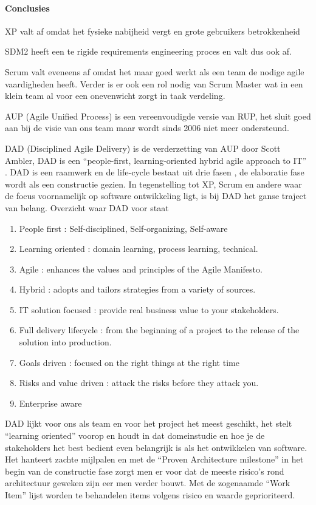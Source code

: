 \paragraph{Conclusies}
\begin{description}
\item XP valt af omdat het fysieke nabijheid vergt en grote gebruikers betrokkenheid
\item SDM2 heeft een te rigide requirements engineering proces en valt dus ook af.
\item Scrum valt eveneens af omdat het maar goed werkt als een team de nodige agile vaardigheden heeft. Verder is er ook een rol nodig van Scrum Master wat in een klein team al voor een onevenwicht zorgt in taak verdeling.
\item AUP (Agile Unified Process) is een vereenvoudigde versie van RUP, het sluit goed aan bij de visie van ons team maar wordt sinds 2006 niet meer ondersteund.
\item DAD (Disciplined Agile Delivery) is de verderzetting van AUP door Scott Ambler, DAD is een ``people-first, learning-oriented hybrid agile approach to IT'' . DAD is een raamwerk en de life-cycle bestaat uit drie fasen , de elaboratie fase wordt als een constructie gezien. In tegenstelling tot XP, Scrum en andere waar de focus voornamelijk op software ontwikkeling ligt, is bij DAD het ganse traject van belang.
Overzicht waar DAD voor staat
	\begin{enumerate}
		\item People first : Self-disciplined, Self-organizing, Self-aware
		\item Learning oriented : domain learning, process learning, technical.
		\item Agile : enhances the values and principles of the Agile Manifesto.
		\item Hybrid : adopts and tailors strategies from a variety of sources.
		\item IT solution focused :  provide real business value to your stakeholders.
		\item Full delivery lifecycle : from the beginning of a project to the release of the solution into production.
		\item Goals driven : focused on the right things at the right time
		\item Risks and value driven : attack the risks before they attack you.
		\item Enterprise aware
	\end{enumerate}


DAD lijkt voor ons als team en voor het project het meest geschikt, het stelt
``learning oriented'' voorop en houdt in dat domeinstudie en hoe je de stakeholders
het best bedient even belangrijk is als het ontwikkelen van software. Het hanteert
zachte mijlpalen en met de ``Proven Architecture milestone''  in het begin van de
constructie fase zorgt men er voor dat de meeste risico's rond architectuur geweken
zijn eer men verder bouwt. Met de zogenaamde ``Work Item''  lijst worden te behandelen
items volgens risico en waarde geprioriteerd.

\end{description}